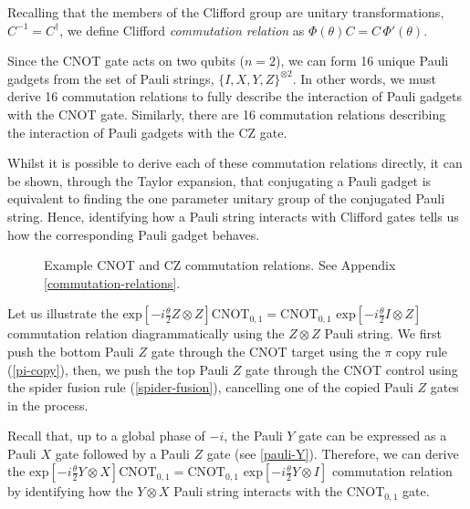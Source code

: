 
Recalling that the members of the Clifford group are unitary transformations, $C^{-1} = C^\dagger$, we define Clifford \textit{commutation relation} as $\Phi(\theta) C = C \, \Phi'(\theta)$.


Since the CNOT gate acts on two qubits ($n=2$), we can form 16 unique Pauli gadgets from the set of Pauli strings, $\{I, X, Y, Z\}^{\otimes 2}$. In other words, we must derive 16 commutation relations to fully describe the interaction of Pauli gadgets with the CNOT gate. Similarly, there are 16 commutation relations describing the interaction of Pauli gadgets with the CZ gate.

Whilst it is possible to derive each of these commutation relations directly, it can be shown, through the Taylor expansion, that conjugating a Pauli gadget is equivalent to finding the one parameter unitary group of the conjugated Pauli string. Hence, identifying how a Pauli string interacts with Clifford gates tells us how the corresponding Pauli gadget behaves.

\begin{figure}[H]
    \centering
    \caption{Example CNOT and CZ commutation relations. See Appendix \ref{commutation-relations}.}
\end{figure}

Let us illustrate the $\text{exp} \left[ - i\frac{\theta}{2} Z \otimes Z \right] \text{CNOT}_{0, 1} = \text{CNOT}_{0, 1} \,\, \text{exp} \left[ - i\frac{\theta}{2} I \otimes Z \right]$ commutation relation diagrammatically using the $Z \otimes Z$ Pauli string. We first push the bottom Pauli $Z$ gate through the CNOT target using the $\pi$ copy rule (\ref{pi-copy}), then, we push the top Pauli $Z$ gate through the CNOT control using the spider fusion rule (\ref{spider-fusion}), cancelling one of the copied Pauli $Z$ gates in the process.


Recall that, up to a global phase of $-i$, the Pauli $Y$ gate can be expressed as a Pauli $X$ gate followed by a Pauli $Z$ gate (see \ref{pauli-Y}). Therefore, we can derive the $\text{exp} \left[ - i\frac{\theta}{2} Y \otimes X \right] \text{CNOT}_{0, 1} = \text{CNOT}_{0, 1} \,\, \text{exp} \left[ - i\frac{\theta}{2} Y \otimes I \right]$ commutation relation by identifying how the $Y \otimes X$ Pauli string interacts with the CNOT$_{0, 1}$ gate.

